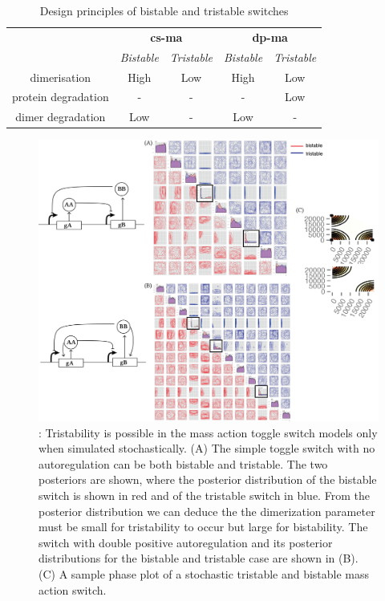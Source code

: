 \begin{table}[htbp]
\centering
\caption{Design principles of bistable and tristable switches}
\label{tab:des_prin}
\begin{tabular}{@{}ccccc@{}}
\toprule
                    & \multicolumn{2}{c}{\textbf{\acrshort{cs-ma}}} & \multicolumn{2}{c}{\textbf{\acrshort{dp-ma}}} \\ \cmidrule(l){2-3}\cmidrule(l){4-5}
                    & \textit{Bistable}    & \textit{Tristable}   & \textit{Bistable}    & \textit{Tristable}   \\\cmidrule(l){2-2}\cmidrule(l){3-3}\cmidrule(l){4-4}\cmidrule(l){5-5}
dimerisation        & High        & Low         & High        & Low         \\
protein degradation & -           & -           & -           & Low         \\
dimer degradation   & Low         & -           & Low         & -           \\\bottomrule
\end{tabular}
\end{table}


\begin{figure}[htbp]
\begin{center}
\includegraphics[width=\textwidth]{../../chapters/chapterStabilityFinder/images/MA_stoch_design_princ.png}
\caption[LoF caption]{ \label{fig:fig7}: Tristability is possible in the mass action toggle switch models only when simulated stochastically. (A) The simple toggle switch with no autoregulation can be both bistable and tristable. The two posteriors are shown, where the posterior distribution of the bistable switch is shown in red and of the tristable switch in blue. From the posterior distribution we can deduce the the dimerization parameter must be small for tristability to occur but large for bistability. The switch with double positive autoregulation and its posterior distributions for the bistable and tristable case are shown in (B). (C) A sample phase plot of a stochastic tristable and bistable mass action switch. }
\end{center}
\end{figure}
\clearpage


